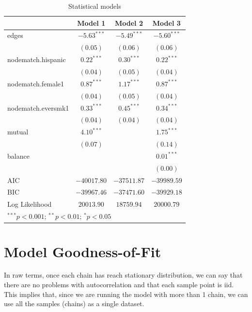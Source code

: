 \documentclass[]{book}
\begin{document}
\begin{table}
\begin{center}
\begin{tabular}{l c c c}
\hline
 & Model 1 & Model 2 & Model 3 \\
\hline
edges              & $-5.63^{***}$ & $-5.49^{***}$ & $-5.60^{***}$ \\
                   & $(0.05)$      & $(0.06)$      & $(0.06)$      \\
nodematch.hispanic & $0.22^{***}$  & $0.30^{***}$  & $0.22^{***}$  \\
                   & $(0.04)$      & $(0.05)$      & $(0.04)$      \\
nodematch.female1  & $0.87^{***}$  & $1.17^{***}$  & $0.87^{***}$  \\
                   & $(0.04)$      & $(0.05)$      & $(0.04)$      \\
nodematch.eversmk1 & $0.33^{***}$  & $0.45^{***}$  & $0.34^{***}$  \\
                   & $(0.04)$      & $(0.04)$      & $(0.04)$      \\
mutual             & $4.10^{***}$  &               & $1.75^{***}$  \\
                   & $(0.07)$      &               & $(0.14)$      \\
balance            &               &               & $0.01^{***}$  \\
                   &               &               & $(0.00)$      \\
\hline
AIC                & $-40017.80$   & $-37511.87$   & $-39989.59$   \\
BIC                & $-39967.46$   & $-37471.60$   & $-39929.18$   \\
Log Likelihood     & $20013.90$    & $18759.94$    & $20000.79$    \\
\hline
\multicolumn{4}{l}{\scriptsize{$^{***}p<0.001$; $^{**}p<0.01$; $^{*}p<0.05$}}
\end{tabular}
\caption{Statistical models}
\label{table:coefficients}
\end{center}
\end{table}

\hypertarget{model-goodness-of-fit}{%
\section{Model Goodness-of-Fit}\label{model-goodness-of-fit}}

In raw terms, once each chain has reach stationary distribution, we can say that there are no problems with autocorrelation and that each sample point is iid. This implies that, since we are running the model with more than 1 chain, we can use all the samples (chains) as a single dataset.
\end{document}
